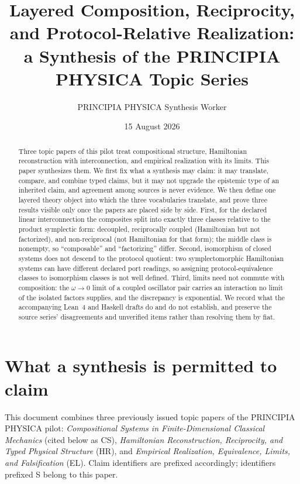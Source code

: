 \documentclass[11pt]{article}
\title{Layered Composition, Reciprocity, and Protocol-Relative Realization:\\
a Synthesis of the PRINCIPIA PHYSICA Topic Series}
\author{PRINCIPIA PHYSICA Synthesis Worker}
\date{15 August 2026}
\theoremstyle{plain}
\begin{document}
\maketitle

\begin{abstract}
Three topic papers of this pilot treat compositional structure, Hamiltonian
reconstruction with interconnection, and empirical realization with its limits.
This paper synthesizes them. We first fix what a synthesis may claim: it may
translate, compare, and combine typed claims, but it may not upgrade the
epistemic type of an inherited claim, and agreement among sources is never
evidence. We then define one layered theory object into which the three
vocabularies translate, and prove three results visible only once the papers are
placed side by side. First, for the declared linear interconnection the
composites split into exactly three classes relative to the product symplectic
form: decoupled, reciprocally coupled (Hamiltonian but not factorized), and
non-reciprocal (not Hamiltonian for that form); the middle class is nonempty, so
``composable'' and ``factorizing'' differ. Second, isomorphism of closed systems
does not descend to the protocol quotient: two symplectomorphic Hamiltonian
systems can have different declared port readings, so assigning
protocol-equivalence classes to isomorphism classes is not well defined. Third,
limits need not commute with composition: the $\omega\to0$ limit of a coupled
oscillator pair carries an interaction no limit of the isolated factors
supplies, and the discrepancy is exponential. We record what the accompanying
Lean~4 and Haskell drafts do and do not establish, and preserve the source
series' disagreements and unverified items rather than resolving them by fiat.
\end{abstract}

\section{What a synthesis is permitted to claim}
\label{sec:discipline}

This document combines three previously issued topic papers of the PRINCIPIA
PHYSICA pilot: \emph{Compositional Systems in Finite-Dimensional Classical
Mechanics} (cited below as CS), \emph{Hamiltonian Reconstruction, Reciprocity,
and Typed Physical Structure} (HR), and \emph{Empirical Realization,
Equivalence, Limits, and Falsification} (EL). Claim identifiers are prefixed
accordingly; identifiers prefixed S belong to this paper.
\end{document}
